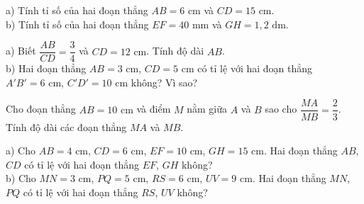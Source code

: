 

\begin{bt}%
	a) Tính tỉ số của hai đoạn thẳng $AB=6\text{ cm}$ và $CD=15\text{ cm}$.\\
	b) Tính tỉ số của hai đoạn thẳng $EF=40\text{ mm}$ và $GH=1{,}2\text{ dm}$.
\end{bt}

\begin{bt}%
	a) Biết $\dfrac{AB}{CD}=\dfrac34$ và $CD=12\text{ cm}$. Tính độ dài $AB$.\\
	b) Hai đoạn thẳng $AB=3\text{ cm}$, $CD=5\text{ cm}$ có tỉ lệ với hai đoạn thẳng $A'B'=6\text{ cm}$, $C'D'=10\text{ cm}$ không? Vì sao?
\end{bt}

\begin{bt}%
	Cho đoạn thẳng $AB=10\text{ cm}$ và điểm $M$ nằm giữa $A$ và $B$ sao cho $\dfrac{MA}{MB}=\dfrac23$. Tính độ dài các đoạn thẳng $MA$ và $MB$.
\end{bt}

\begin{bt}%
	a) Cho $AB=4\text{ cm}$, $CD=6\text{ cm}$, $EF=10\text{ cm}$, $GH=15\text{ cm}$. Hai đoạn thẳng $AB$, $CD$ có tỉ lệ với hai đoạn thẳng $EF$, $GH$ không?\\
	b) Cho $MN=3\text{ cm}$, $PQ=5\text{ cm}$, $RS=6\text{ cm}$, $UV=9\text{ cm}$. Hai đoạn thẳng $MN$, $PQ$ có tỉ lệ với hai đoạn thẳng $RS$, $UV$ không?
\end{bt}

